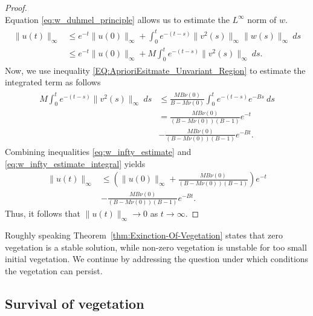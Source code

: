 \documentclass[11pt, a4paper]{article}
\theoremstyle{break}
\theoremstyle{break}
\theoremstyle{break}
\theoremstyle{break}
\theoremstyle{break}
\theoremstyle{break}
\theoremstyle{break}
\theoremstyle{break}
\theoremstyle{break}
\begin{document}
\begin{proof}
\begin{equation}
    \end{equation}
    Equation \eqref{eq:w_duhmel_principle} allows us to estimate the $L^\infty$ norm of $w$.
    \begin{align}
        \label{eq:w_infty_estimate}
        \begin{split}
            \|u(t)\|_\infty 
            &\leq e^{-t}\|u(0)\|_\infty + \int_0^t e^{-(t-s)} \|v^2(s)\|_\infty \|w(s)\|_\infty\:ds \\
            &\leq e^{-t}\|u(0)\|_\infty + M \int_0^t e^{-(t-s)} \|v^2(s)\|_\infty \:ds.
        \end{split}
    \end{align}
    Now, we use inequality \eqref{EQ:AprioriEsitmate_Unvariant_Region} to estimate the integrated term as follows
    \begin{align}
        \label{eq:w_infty_estimate_integral}
        \begin{split}
            M \int_0^t e^{-(t-s)} \|v^2(s)\|_\infty \:ds 
            &\leq
            \frac{M B \nu(0)}{B-M \nu(0)} \int_0^t e^{-(t-s)} e^{-Bs}\:ds \\
            &= 
            \frac{M B \nu(0)}{(B-M\nu(0))(B-1)} e^{-t} \\
            &- 
            \frac{M B \nu(0)}{(B - M \nu(0))(B-1)} e^{-Bt}.
        \end{split}
    \end{align}
    Combining inequalities \eqref{eq:w_infty_estimate} and \eqref{eq:w_infty_estimate_integral} yields
    \begin{align*}
        \|u(t)\|_\infty 
        &\leq \left( \|u(0)\|_\infty + \frac{M B \nu(0)}{(B-M\nu(0))(B-1)} \right) e^{-t} \\
        &- \frac{M B \nu(0)}{(B-M\nu(0))(B-1)} e^{-Bt}.
    \end{align*}
    Thus, it follows  that $\|u(t)\|_\infty \rightarrow 0$ as $t \rightarrow \infty$.
\end{proof}

Roughly speaking Theorem~\ref{thm:Exinction-Of-Vegetation} states that zero vegetation is a stable solution, while non-zero vegetation is unstable for too small initial vegetation. We continue by addressing the question under which conditions the vegetation can persist. 

\subsection{Survival of vegetation}
\end{document}
